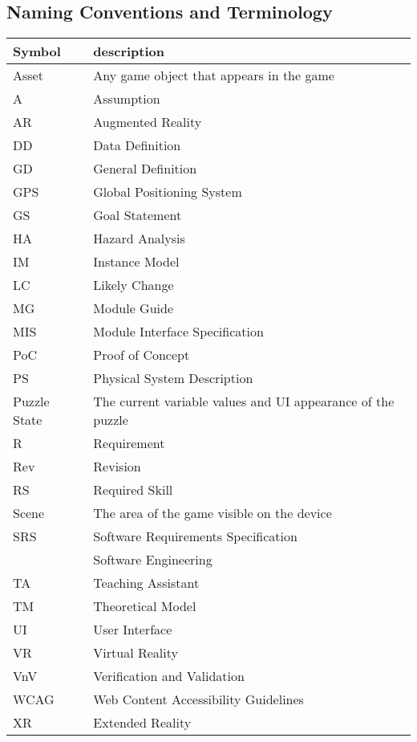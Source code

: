 \documentclass[12pt]{article}
\begin{document}
\subsection{Naming Conventions and Terminology}
\label{Naming_Convention_Table}
\renewcommand{\arraystretch}{1.2}
\begin{tabular}{l l} 
  \toprule		
  \textbf{Symbol} & \textbf{description}\\
  \midrule 
  Asset & Any game object that appears in the game\\
  A & Assumption\\
  AR & Augmented Reality\\
  DD & Data Definition\\
  GD & General Definition\\
  GPS & Global Positioning System\\
  GS & Goal Statement\\
  HA & Hazard Analysis\\
  IM & Instance Model\\
  LC & Likely Change\\
  MG & Module Guide\\
  MIS & Module Interface Specification\\
  PoC & Proof of Concept \\ 
  PS & Physical System Description\\
  Puzzle State & The current variable values and UI appearance of the puzzle\\
  R & Requirement\\
  Rev & Revision\\
  RS & Required Skill\\
  Scene & The area of the game visible on the device\\
  SRS & Software Requirements Specification\\
  \progname{} & Software Engineering\\
  TA & Teaching Assistant\\
  TM & Theoretical Model\\
  UI & User Interface\\
  VR & Virtual Reality\\
  VnV & Verification and Validation \\
  WCAG & Web Content Accessibility Guidelines \\
  XR & Extended Reality\\
  \bottomrule
\end{tabular}\\
\end{document}

